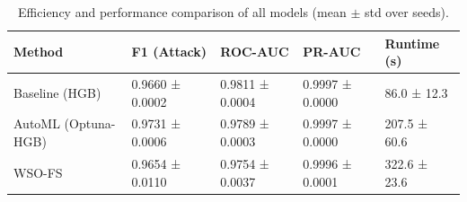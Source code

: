 \begin{table}
\caption{Efficiency and performance comparison of all models (mean $\pm$ std over seeds).}
\label{tab:efficiency}
\begin{tabular}{lllll}
\toprule
Method & F1 (Attack) & ROC-AUC & PR-AUC & Runtime (s) \\
\midrule
Baseline (HGB) & 0.9660 ± 0.0002 & 0.9811 ± 0.0004 & 0.9997 ± 0.0000 & 86.0 ± 12.3 \\
AutoML (Optuna-HGB) & 0.9731 ± 0.0006 & 0.9789 ± 0.0003 & 0.9997 ± 0.0000 & 207.5 ± 60.6 \\
WSO-FS & 0.9654 ± 0.0110 & 0.9754 ± 0.0037 & 0.9996 ± 0.0001 & 322.6 ± 23.6 \\
\bottomrule
\end{tabular}
\end{table}
